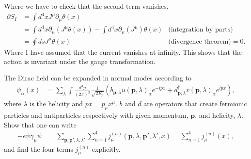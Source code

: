 \documentclass[working, oneside]{../../../Preambles/tuftebook}
\begin{document}
Where we have to check that the second term vanishes.
\begin{align*}
    \partial S_{I} &= \int d^{4}x J^{\mu }\partial_{\mu }\theta \left( x \right) \\
                   &= \int d^{4}x \partial_{\mu }\left( J^{\mu }\theta \left( x \right)  \right) - \int d^{4}x \partial_{\mu }\left( J^{\mu } \right) \theta \left( x \right) &\text{(integration by parts)}\\
                   &= \oint ds J^{\mu }\theta \left( x \right)  &\text{(divergence theorem)}=0
.\end{align*}
Where I have assumed that the current vanishes at infinity. This shows that the action is invariant under the gauge transformation.
\begin{exercise}[4]
The Dirac field can be expanded in normal modes according to
\begin{align*}
\psi_\alpha(x)
&= \sum_\lambda \int \frac{d^3p}{(2\pi)^3} \frac{1}{\sqrt{2E_p}} \left( b_{\mathbf{p}, \lambda} u(\mathbf{p}, \lambda)_\alpha e^{-i p x} + d_{\mathbf{p}, \lambda}^\dagger v(\mathbf{p}, \lambda)_\alpha e^{i p x} \right), \tag{19}
\end{align*}
where \( \lambda \) is the helicity and \( px = p_\mu x^\mu \). \( b \) and \( d \) are operators that create fermionic particles and antiparticles respectively with given momentum, \( \mathbf{p} \), and helicity, \( \lambda \). Show that one can write
\begin{align*}
-e \overline{\psi} \gamma_\mu \psi
&= \sum_{\mathbf{p}, \mathbf{p}', \lambda, \lambda'} \sum_{n=1}^4 j_\mu^{(n)} (\mathbf{p}, \lambda, \mathbf{p}', \lambda', x) = \sum_{n=1}^4 j_\mu^{(n)}(x), \tag{20}
\end{align*}
and find the four terms \( j_\mu^{(n)} \) explicitly.
\end{exercise}
\end{document}
